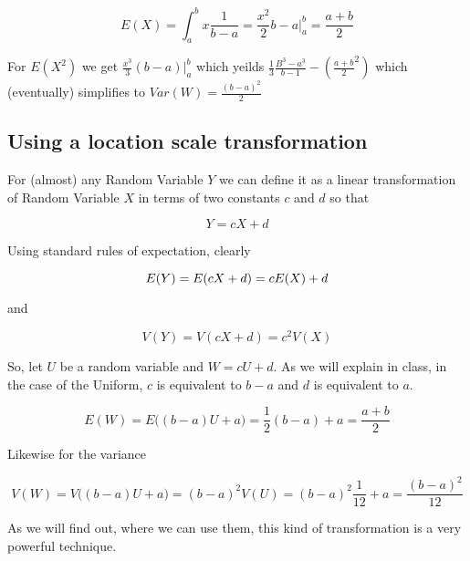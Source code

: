 \documentclass[12pt]{extbook}
\begin{document}
\begin{displaymath}
E(X) = \int_a^b x \frac{1}{b-a} = \frac{x^2}{2}b-a|^b_a=\frac{a+b}{2}
\end{displaymath}

For $E(X^2)$ we get $\frac{x^3}{3}(b-a)|^b_a$ which yeilds $\frac{1}{3}\frac{B^3-a^3}{b-1} - \left(\frac{a+b}{2}^2\right)$ which (eventually) simplifies to $Var(W)=\frac{(b-a)^2}{2}$




\subsection{Using a location scale transformation}

For (almost) any Random Variable $Y$ we can define it as  a linear transformation of Random Variable $X$ in terms of two constants $c$ and $d$ so that

\begin{displaymath}
Y = cX + d
\end{displaymath}

Using standard rules of expectation, clearly 

\begin{displaymath}
E(Y) = E( cX + d) = cE(X) + d\\
\end{displaymath}

and 

\begin{displaymath}
V(Y) = V(cX+d) = c^2 V(X)
\end{displaymath}


So, let $U$ be a random variable and $W=cU + d$.   As we will explain in class, in the case of the Uniform, $c$ is equivalent to $b-a$ and $d$ is equivalent to $a$.


\begin{displaymath}
E(W) = E \big( (b-a) U + a \big) =  \frac{1}{2}(b-a) + a = \frac{a+b}{2}
\end{displaymath}

Likewise for the variance

\begin{displaymath}
V(W) = V \big( (b-a) U + a \big) =  (b-a)^2 V(U) = (b-a)^2 \frac{1}{12} + a = \frac{(b-a)^2}{12}
\end{displaymath}


As we will find out, where we can use them, this kind of transformation is a very powerful technique.
\end{document}
